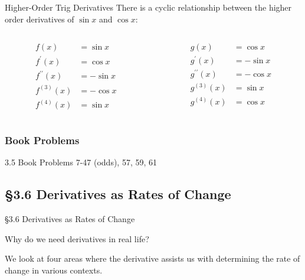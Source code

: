 \documentclass[cal1spr16Lectures.tex]{subfiles}
\begin{document}
\begin{frame}{\small Higher-Order Trig Derivatives}
There is a cyclic relationship between the higher order derivatives of $\sin x$ and $\cos x$:
\begin{columns}
\begin{column}{.45\textwidth}
\[\begin{split}
	f(x) &=\sin x \\  
	f^{\prime}(x) &=\cos x \\
	f^{\prime\prime}(x) &=-\sin x \\
	f^{(3)}(x) &=-\cos x \\
	f^{(4)}(x) &=\sin x 
\end{split}\]
\end{column}
\begin{column}{.6\textwidth}
\[\begin{split}
	g(x) &=\cos x \\
	g^{\prime}(x) &=-\sin x \\
	g^{\prime\prime}(x) &=-\cos x \\
	g^{(3)}(x) &=\sin x \\
	g^{(4)}(x) &=\cos x 
\end{split}\]
\end{column}
\end{columns}
\end{frame}

\subsubsection{Book Problems}

\begin{frame}
\begin{block}{3.5 Book Problems} 7-47 (odds), 57, 59, 61 \end{block} 
\end{frame}

\subsection[3.6 Derivatives as Rates of Change]{\S 3.6 Derivatives as Rates of Change}

\begin{frame}{\S 3.6 Derivatives as Rates of Change}
\begin{que}  
Why do we need derivatives in real life? 
\end{que}  

We look at four areas where the derivative assists us with determining the rate of change in various contexts.
\end{frame}
\end{document}
